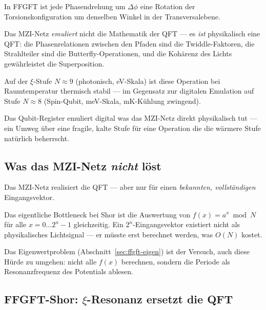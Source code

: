 \begin{foundation}
In FFGFT ist jede Phasendrehung um $\Delta\phi$
eine Rotation der Torsionskonfiguration
um denselben Winkel in der Transversalebene.

Das MZI-Netz \emph{emuliert} nicht die Mathematik
der QFT --- es \emph{ist} physikalisch eine QFT:
die Phasenrelationen zwischen den Pfaden sind
die Twiddle-Faktoren, die Strahlteiler sind
die Butterfly-Operationen, und die Kohärenz
des Lichts gewährleistet die Superposition.

Auf der $\xi$-Stufe $N \approx 9$ (photonisch, eV-Skala)
ist diese Operation bei Raumtemperatur thermisch stabil ---
im Gegensatz zur digitalen Emulation auf Stufe $N \approx 8$
(Spin-Qubit, meV-Skala, mK-Kühlung zwingend).

Das Qubit-Register emuliert digital was das MZI-Netz
direkt physikalisch tut --- ein Umweg über eine
fragile, kalte Stufe für eine Operation die die
wärmere Stufe natürlich beherrscht.
\end{foundation}

\subsection{Was das MZI-Netz \emph{nicht} löst}

Das MZI-Netz realisiert die QFT --- aber nur für
einen \emph{bekannten, vollständigen} Eingangsvektor.

Das eigentliche Bottleneck bei Shor ist die
Auswertung von $f(x) = a^x \bmod N$ für alle
$x = 0 \ldots 2^n-1$ gleichzeitig.
Ein $2^n$-Eingangsvektor existiert nicht als
physikalisches Lichtsignal --- er müsste erst
berechnet werden, was $O(N)$ kostet.

Das Eigenwertproblem (Abschnitt~\ref{sec:ffgft-eigen})
ist der Versuch, auch diese Hürde zu umgehen:
nicht alle $f(x)$ berechnen, sondern die Periode
als Resonanzfrequenz des Potentials ablesen.




\subsection{FFGFT-Shor: \texorpdfstring{$\xi$}{xi}-Resonanz ersetzt die QFT}

